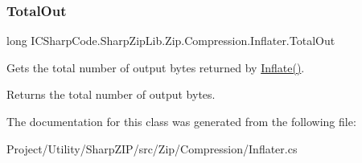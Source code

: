 \subsubsection{\texorpdfstring{Total\+Out}{TotalOut}}
{\footnotesize\ttfamily long I\+C\+Sharp\+Code.\+Sharp\+Zip\+Lib.\+Zip.\+Compression.\+Inflater.\+Total\+Out\hspace{0.3cm}{\ttfamily [get]}}



Gets the total number of output bytes returned by \hyperlink{class_i_c_sharp_code_1_1_sharp_zip_lib_1_1_zip_1_1_compression_1_1_inflater_a73bfcbd5d20b4838bd28364fff12324e}{Inflate()}. 

\begin{DoxyReturn}{Returns}
the total number of output bytes. 
\end{DoxyReturn}


The documentation for this class was generated from the following file\+:\begin{DoxyCompactItemize}
\item 
Project/\+Utility/\+Sharp\+Z\+I\+P/src/\+Zip/\+Compression/Inflater.\+cs\end{DoxyCompactItemize}
